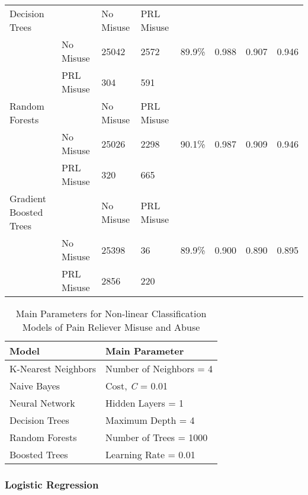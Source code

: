 \documentclass[sigconf]{acmart}
\begin{document}
\begin{table*}[ht]
\begin{tabular}{llllllll}
    \midrule
    Decision Trees & & No Misuse & PRL Misuse &  &  &  & \\
     & No Misuse & 25042 & 2572 & 89.9\% & 0.988 & 0.907 & 0.946 \\
     & PRL Misuse & 304 & 591 &  &  &  & \\
    \midrule
    Random Forests & & No Misuse & PRL Misuse &  &  &  & \\
     & No Misuse & 25026 & 2298 & 90.1\% & 0.987 & 0.909 & 0.946 \\
     & PRL Misuse & 320 & 665 &  &  &  & \\
    \midrule
    Gradient Boosted Trees & & No Misuse & PRL Misuse &  &  &  & \\
     & No Misuse & 25398 & 36 & 89.9\% & 0.900 & 0.890 & 0.895 \\
     & PRL Misuse & 2856 & 220 &  &  &  & \\
    \bottomrule
  \end{tabular}
\end{table*}

 
\begin{table}
  \caption{Main Parameters for Non-linear Classification Models of 
  Pain Reliever Misuse and Abuse}
  \label{tab:freq}
  \begin{tabular}{ll}
    \toprule
    Model & Main Parameter \\
    \midrule
    K-Nearest Neighbors & Number of Neighbors = 4 \\
    Naive Bayes & Cost, \textit{C} = 0.01 \\
    Neural Network & Hidden Layers = 1 \\
    Decision Trees & Maximum Depth = 4 \\ 
    Random Forests & Number of Trees = 1000 \\
    Boosted Trees & Learning Rate = 0.01 \\ 
    \bottomrule
  \end{tabular}
\end{table}


\subsubsection{Logistic Regression}
\end{document}
